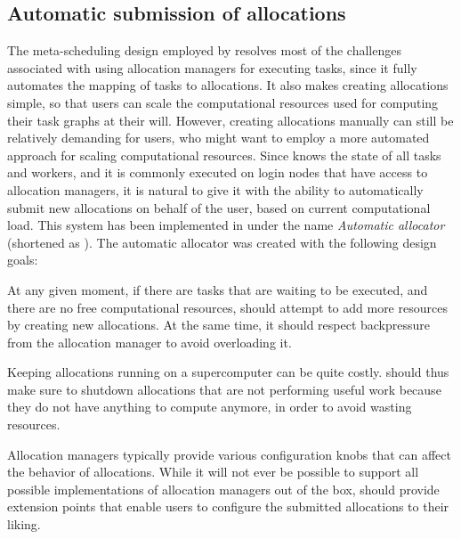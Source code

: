 \subsection{Automatic submission of allocations}
\label{hq:automatic-allocation}
The meta-scheduling design employed by \hyperqueue{} resolves most of the challenges
associated with using allocation managers for executing tasks, since it fully automates the mapping
of tasks to allocations. It also makes creating allocations simple, so that users can scale the
computational resources used for computing their task graphs at their will. However, creating
allocations manually can still be relatively demanding for users, who might want to employ a more
automated approach for scaling computational resources. Since \hyperqueue{} knows the
state of all tasks and workers, and it is commonly executed on login nodes that have access to
allocation managers, it is natural to give it with the ability to automatically submit new
allocations on behalf of the user, based on current computational load. This system has been
implemented in \hq{} under the name \emph{Automatic allocator} (shortened as \autoalloc{}). The automatic
allocator was created with the following design goals:

\begin{description}[wide=0pt]
	\item[Allow computational resources to scale up] At any given moment, if there are tasks that are waiting to be executed, and there are no free
		computational resources, \autoalloc{} should attempt to add more resources by creating
		new allocations. At the same time, it should respect backpressure from the allocation manager to
		avoid overloading it.
	\item[Allow computational resources to scale down] Keeping allocations running on a supercomputer can be quite costly. \Autoalloc{} should
		thus make sure to shutdown allocations that are not performing useful work because they do not have
		anything to compute anymore, in order to avoid wasting resources.
	\item[Be flexible] Allocation managers typically provide various configuration knobs that can affect the behavior of
		allocations. While it will not ever be possible to support all possible implementations of
		allocation managers out of the box, \autoalloc{} should provide extension points that
		enable users to configure the submitted allocations to their liking.
\end{description}

